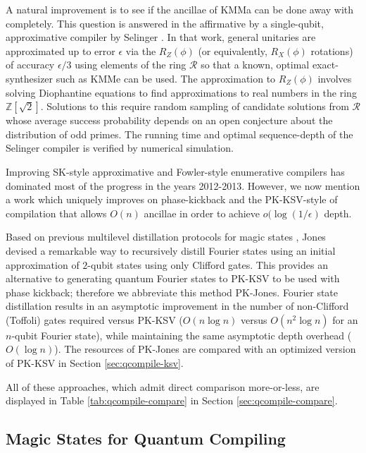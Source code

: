 A natural improvement is to see if the ancillae of KMMa can be done away with
completely. This question is answered in the affirmative by a single-qubit,
approximative compiler by Selinger
\cite{Selinger2012}. In that work, general unitaries are approximated up to
error $\epsilon$ via the $R_Z(\phi)$ (or equivalently, $R_X(\phi)$ rotations)
of accuracy $\epsilon/3$ using elements of the
ring $\mathcal{R}$ so that a known, optimal exact-synthesizer such as KMMe
can be used. The approximation to $R_Z(\phi)$ involves solving
Diophantine equations to find approximations to real numbers in the
ring $\mathbb{Z}\left[\sqrt{2}\right]$. Solutions to this require
random sampling of candidate solutions from $\mathcal{R}$ whose average
success probability depends on an open conjecture about the distribution
of odd primes. The running time and optimal sequence-depth of the
Selinger compiler is verified by numerical simulation.

Improving SK-style approximative and Fowler-style enumerative compilers has
dominated most of the progress in the years 2012-2013. However, we now mention
a work which uniquely improves on phase-kickback and the PK-KSV-style of
compilation that allows $O(n)$ ancillae in order to achieve $o(\log(1/\epsilon)$
depth.

Based on previous multilevel distillation protocols for magic states \cite{Jones2012},
Jones devised a remarkable way to recursively distill Fourier states using an
initial approximation of $2$-qubit states using only Clifford gates. This provides
an alternative to generating quantum Fourier states to PK-KSV to be used with
phase kickback; therefore we abbreviate this method PK-Jones. Fourier state
distillation results
in an asymptotic improvement in the number of non-Clifford (Toffoli) gates
required versus PK-KSV ($O(n\log n)$ versus $O(n^2\log n)$ for an
$n$-qubit Fourier state), while maintaining the same asymptotic depth overhead
($O(\log n)$). The resources of PK-Jones are compared with an optimized version of PK-KSV in
Section \ref{sec:qcompile-ksv}.

All of these approaches, which admit direct comparison more-or-less, are
displayed in Table \ref{tab:qcompile-compare} in Section
\ref{sec:qcompile-compare}.

\subsection{Magic States for Quantum Compiling}

